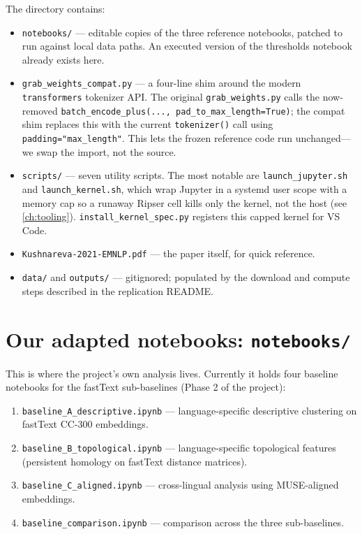 The directory contains:

\begin{itemize}
  \item \texttt{notebooks/} --- editable copies of the three reference notebooks, patched to run against local data paths. An executed version of the thresholds notebook already exists here.
  \item \texttt{grab\_weights\_compat.py} --- a four-line shim around the modern \texttt{transformers} tokenizer API. The original \texttt{grab\_weights.py} calls the now-removed \texttt{batch\_encode\_plus(..., pad\_to\_max\_length=True)}; the compat shim replaces this with the current \texttt{tokenizer()} call using \texttt{padding="max\_length"}. This lets the frozen reference code run unchanged---we swap the import, not the source.
  \item \texttt{scripts/} --- seven utility scripts. The most notable are \texttt{launch\_jupyter.sh} and \texttt{launch\_kernel.sh}, which wrap Jupyter in a systemd user scope with a memory cap so a runaway Ripser cell kills only the kernel, not the host (see \autoref{ch:tooling}). \texttt{install\_kernel\_spec.py} registers this capped kernel for VS Code.
  \item \texttt{Kushnareva-2021-EMNLP.pdf} --- the paper itself, for quick reference.
  \item \texttt{data/} and \texttt{outputs/} --- gitignored; populated by the download and compute steps described in the replication README.
\end{itemize}

\section{Our adapted notebooks: \texttt{notebooks/}}
\label{sec:notebooks}

This is where the project's own analysis lives. Currently it holds four baseline notebooks for the fastText sub-baselines (Phase 2 of the project):

\begin{enumerate}
  \item \texttt{baseline\_A\_descriptive.ipynb} --- language-specific descriptive clustering on fastText CC-300 embeddings.
  \item \texttt{baseline\_B\_topological.ipynb} --- language-specific topological features (persistent homology on fastText distance matrices).
  \item \texttt{baseline\_C\_aligned.ipynb} --- cross-lingual analysis using MUSE-aligned embeddings.
  \item \texttt{baseline\_comparison.ipynb} --- comparison across the three sub-baselines.
\end{enumerate}


